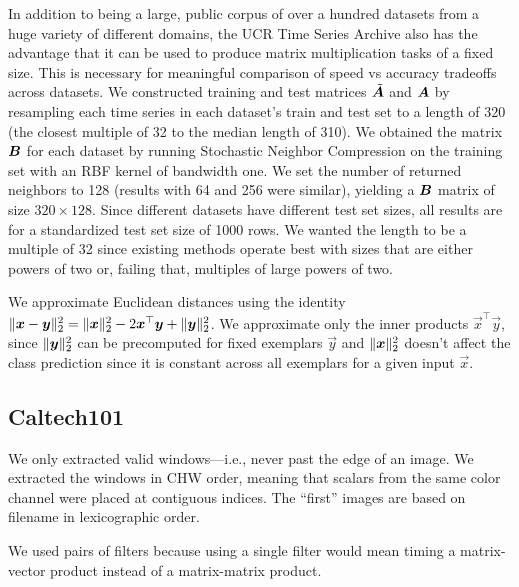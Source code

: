 In addition to being a large, public corpus of over a hundred datasets from a huge variety of different domains, the UCR Time Series Archive also has the advantage that it can be used to produce matrix multiplication tasks of a fixed size. This is necessary for meaningful comparison of speed vs accuracy tradeoffs across datasets. We constructed training and test matrices $\tilde{\bm{A}}$ and $\bm{A}$ by resampling each time series in each dataset's train and test set to a length of $320$ (the closest multiple of 32 to the median length of 310). We obtained the matrix $\bm{B}$ for each dataset by running Stochastic Neighbor Compression \cite{snc} on the training set with an RBF kernel of bandwidth one. We set the number of returned neighbors to 128 (results with 64 and 256 were similar), yielding a $\bm{B}$ matrix of size $320 \times 128$. %
Since different datasets have different test set sizes, all results are for a standardized test set size of 1000 rows. We wanted the length to be a multiple of 32 since existing methods operate best with sizes that are either powers of two or, failing that, multiples of large powers of two.

We approximate Euclidean distances using the identity $\lVert\bm{x} - \bm{y}\rVert_2^2 = \lVert\bm{x}\rVert_2^2 - 2\bm{x}^\top \bm{y} + \lVert\bm{y}\rVert_2^2$. We approximate only the inner products $\vec{x}^\top \vec{y}$, since $\lVert\bm{y}\rVert_2^2$ can be precomputed for fixed exemplars $\vec{y}$ and $\lVert\bm{x}\rVert_2^2$ doesn't affect the class prediction since it is constant across all exemplars for a given input $\vec{x}$.


\subsection{Caltech101}

We only extracted valid windows---i.e., never past the edge of an image. We extracted the windows in CHW order, meaning that scalars from the same color channel were placed at contiguous indices. The ``first'' images are based on filename in lexicographic order.

We used pairs of filters because using a single filter would mean timing a matrix-vector product instead of a matrix-matrix product.

